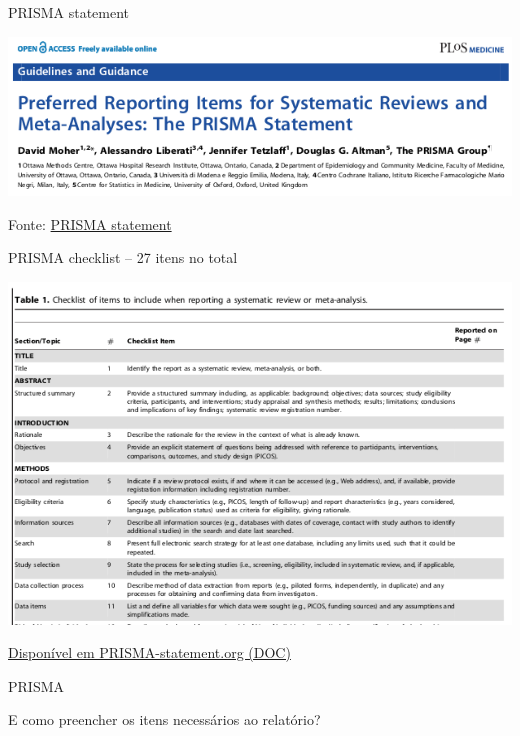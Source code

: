 \documentclass{beamer}
\begin{document}
\begin{frame}{PRISMA statement}
  \begin{center}
    \includegraphics[width=\textwidth]{Revisao_resumo/PRISMA-statement}
  \end{center}

  \vfill
  \scriptsize
  \hfill Fonte: \href{https://doi.org/10.1371/journal.pmed.1000097}
  {PRISMA statement}
\end{frame}

\begin{frame}{PRISMA checklist -- 27 itens no total}
  \begin{center}
    \includegraphics[height=.8\textheight]{Revisao_resumo/PRISMA-checklist}
  \end{center}

  \vfill
  \scriptsize
  \hfill \href{http://www.prisma-statement.org/}
  {\tiny Disponível em PRISMA-statement.org (DOC)}
\end{frame}

\begin{frame}{PRISMA}
  \begin{center}
    E como preencher os itens necessários ao relatório?
  \end{center}
\end{frame}
\end{document}
